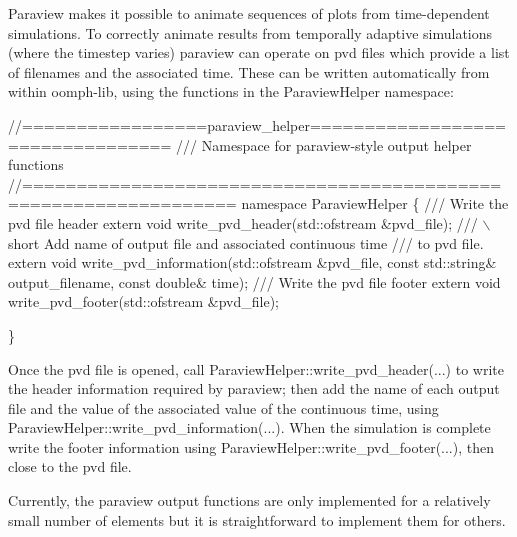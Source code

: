 Paraview makes it possible to animate sequences of plots from time-\/dependent simulations. To correctly animate results from temporally adaptive simulations (where the timestep varies) paraview can operate on pvd files which provide a list of filenames and the associated time. These can be written automatically from within {\ttfamily oomph-\/lib}, using the functions in the {\ttfamily Paraview\+Helper} namespace\+:

 
\begin{DoxyCodeInclude}
\textcolor{comment}{//=================paraview\_helper=================================}
\textcolor{comment}{/// Namespace for paraview-style output helper functions }
\textcolor{comment}{}\textcolor{comment}{//=================================================================}
\textcolor{keyword}{namespace }ParaviewHelper
\{
\textcolor{comment}{}
\textcolor{comment}{ /// Write the pvd file header}
\textcolor{comment}{} \textcolor{keyword}{extern} \textcolor{keywordtype}{void} write\_pvd\_header(std::ofstream &pvd\_file);
 \textcolor{comment}{}
\textcolor{comment}{ /// \(\backslash\)short Add name of output file and associated continuous time}
\textcolor{comment}{ /// to pvd file.}
\textcolor{comment}{} \textcolor{keyword}{extern} \textcolor{keywordtype}{void} write\_pvd\_information(std::ofstream &pvd\_file,
                                   \textcolor{keyword}{const} std::string& output\_filename,
                                   \textcolor{keyword}{const} \textcolor{keywordtype}{double}& time);
 \textcolor{comment}{}
\textcolor{comment}{ /// Write the pvd file footer}
\textcolor{comment}{} \textcolor{keyword}{extern} \textcolor{keywordtype}{void} write\_pvd\_footer(std::ofstream &pvd\_file);

\}

\end{DoxyCodeInclude}


Once the pvd file is opened, call {\ttfamily Paraview\+Helper\+::write\+\_\+pvd\+\_\+header}(...) to write the header information required by paraview; then add the name of each output file and the value of the associated value of the continuous time, using {\ttfamily Paraview\+Helper\+::write\+\_\+pvd\+\_\+information}(...). When the simulation is complete write the footer information using {\ttfamily Paraview\+Helper\+::write\+\_\+pvd\+\_\+footer}(...), then close to the pvd file.

Currently, the paraview output functions are only implemented for a relatively small number of elements but it is straightforward to implement them for others.

